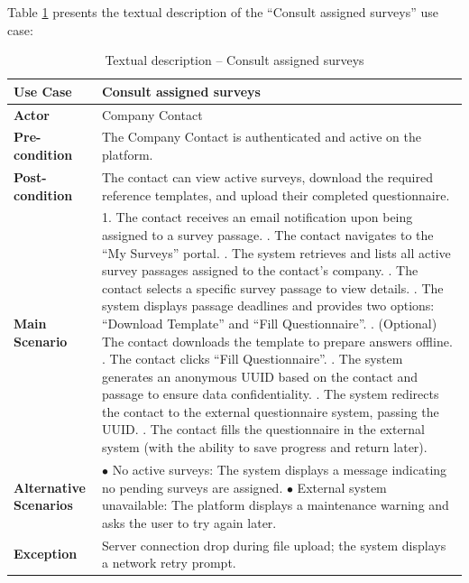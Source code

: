 \documentclass[12pt,a4paper]{report}
\begin{document}
\newpage
Table \ref{tab:refinement_consult_surveys} presents the textual description of the ``Consult assigned surveys'' use case:

\begin{table}[H]
\centering
\caption{Textual description -- Consult assigned surveys}
\label{tab:refinement_consult_surveys}
\vspace{0.2cm}
\small
\renewcommand{\arraystretch}{1.15}
\begin{tabular}{|p{3.5cm}|p{12.0cm}|}
\hline
\textbf{Use Case} & Consult assigned surveys \\ \hline
\textbf{Actor} & Company Contact \\ \hline
\textbf{Pre-condition} & The Company Contact is authenticated and active on the platform. \\ \hline
\textbf{Post-condition} & The contact can view active surveys, download the required reference templates, and upload their completed questionnaire. \\ \hline
\textbf{Main Scenario} & 
1. The contact receives an email notification upon being assigned to a survey passage. \newline
2. The contact navigates to the ``My Surveys'' portal. \newline
3. The system retrieves and lists all active survey passages assigned to the contact's company. \newline
4. The contact selects a specific survey passage to view details. \newline
5. The system displays passage deadlines and provides two options: ``Download Template'' and ``Fill Questionnaire''. \newline
6. (Optional) The contact downloads the template to prepare answers offline. \newline
7. The contact clicks ``Fill Questionnaire''. \newline
8. The system generates an anonymous UUID based on the contact and passage to ensure data confidentiality. \newline
9. The system redirects the contact to the external questionnaire system, passing the UUID. \newline
10. The contact fills the questionnaire in the external system (with the ability to save progress and return later). \\ \hline
\textbf{Alternative Scenarios} & 
$\bullet$ No active surveys: The system displays a message indicating no pending surveys are assigned. \newline
$\bullet$ External system unavailable: The platform displays a maintenance warning and asks the user to try again later. \\ \hline
\textbf{Exception} & Server connection drop during file upload; the system displays a network retry prompt. \\ \hline
\end{tabular}
\end{table}
\end{document}
